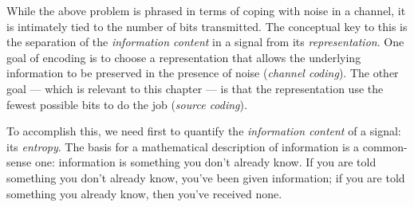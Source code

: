 While the above problem is phrased in terms of coping with noise in a
channel, it is intimately tied to the number of bits transmitted. The
conceptual key to this is the separation of the \emph{information
content} in a signal from its \emph{representation}.  One goal of
encoding is to choose a representation that allows the underlying
information to be preserved in the presence of noise (\emph{channel
coding}). The other goal --- which is relevant to this chapter --- is
that the representation use the fewest possible bits to do the job
(\emph{source coding}).

To accomplish this, we need first to quantify the \emph{information
content} of a signal: its \emph{entropy}. The basis for a mathematical
description of information is a common-sense one: information is
something you don't already know. If you are told something you don't
already know, you've been given information; if you are told something you
already know, then you've received none.


\end{window}
